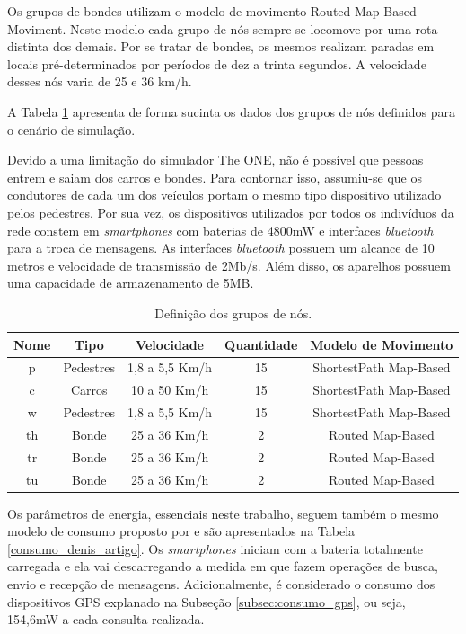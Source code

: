 Os grupos de bondes utilizam o modelo de movimento Routed Map-Based Moviment. Neste modelo cada grupo de nós sempre se locomove por uma rota distinta dos demais. Por se tratar de bondes, os mesmos realizam paradas em locais pré-determinados por períodos de dez a trinta segundos. A velocidade desses nós varia de 25 e 36 km/h. 

A Tabela \ref{grupos_nos} apresenta de forma sucinta os dados dos grupos de nós definidos para o cenário de simulação.

Devido a uma limitação do simulador The ONE, não é possível que pessoas entrem e saiam dos carros e bondes. Para contornar isso, assumiu-se que os condutores de cada um dos veículos portam o mesmo tipo dispositivo utilizado pelos pedestres. Por sua vez, os dispositivos utilizados por todos os indivíduos da rede constem em \emph{smartphones} com baterias de 4800mW e interfaces \emph{bluetooth} para a troca de mensagens. As interfaces \emph{bluetooth} possuem um alcance de 10 metros e velocidade de transmissão de 2Mb/s. Além disso, os aparelhos possuem uma capacidade de armazenamento de 5MB.

\begin{table}
\centering
\caption{Definição dos grupos de nós.}
\label{grupos_nos}
\begin{tabular}{|c|c|c|c|c|}
\hline
Nome          & Tipo      & Velocidade     & Quantidade & Modelo de Movimento               \\ \hline
p             & Pedestres & 1,8 a 5,5 Km/h & 15         & ShortestPath  Map-Based \\ \hline
c             & Carros    & 10 a 50 Km/h   & 15         & ShortestPath  Map-Based \\ \hline
w             & Pedestres & 1,8 a 5,5 Km/h & 15         & ShortestPath  Map-Based  \\ \hline
th            & Bonde     & 25 a 36 Km/h   & 2          & Routed Map-Based         \\ \hline
tr            & Bonde     & 25 a 36 Km/h   & 2          & Routed Map-Based         \\ \hline
tu            & Bonde     & 25 a 36 Km/h   & 2          & Routed Map-Based         \\ \hline
\end{tabular}
\end{table}

Os parâmetros de energia, essenciais neste trabalho, seguem também o mesmo modelo de consumo proposto por \cite{denis_artigo} e são apresentados na Tabela \ref{consumo_denis_artigo}. Os \emph{smartphones} iniciam com a bateria totalmente carregada e ela vai descarregando a medida em que fazem operações de busca, envio e recepção de mensagens. Adicionalmente, é considerado o consumo dos dispositivos GPS explanado na Subseção \ref{subsec:consumo_gps}, ou seja, 154,6mW a cada consulta realizada. 

